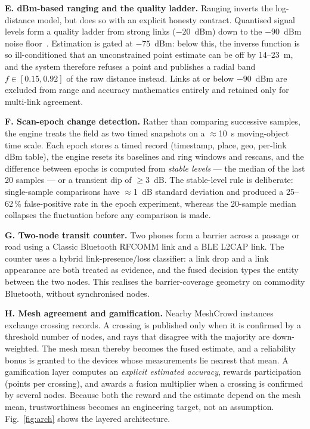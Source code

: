 \documentclass[journal,10pt]{IEEEtran}
\begin{document}
\textbf{E. dBm-based ranging and the quality ladder.} Ranging inverts the
log-distance model, but does so with an explicit honesty contract. Quantised
signal levels form a quality ladder from strong links ($-20$~dBm) down to the
$-90$~dBm noise floor~\cite{ramirez2021,milano2024,bai2020}. Estimation is gated
at $-75$~dBm: below this, the inverse function is so ill-conditioned that an
unconstrained point estimate can be off by 14--23~m, and the system therefore
refuses a point and publishes a radial band $f \in [0.15, 0.92]$ of the raw
distance instead. Links at or below $-90$~dBm are excluded from range and
accuracy mathematics entirely and retained only for multi-link agreement.

\textbf{F. Scan-epoch change detection.} Rather than comparing successive
samples, the engine treats the field as two timed snapshots on a $\approx$10~s
moving-object time scale. Each epoch stores a timed record (timestamp, place,
geo, per-link dBm table), the engine resets its baselines and ring windows and
rescans, and the difference between epochs is computed from \emph{stable levels}
--- the median of the last 20 samples --- or a transient dip of $\geq 3$~dB. The
stable-level rule is deliberate: single-sample comparisons have $\approx$1~dB
standard deviation and produced a 25--62\,\% false-positive rate in the epoch
experiment, whereas the 20-sample median collapses the fluctuation before any
comparison is made.

\textbf{G. Two-node transit counter.} Two phones form a barrier across a
passage or road using a Classic Bluetooth RFCOMM link and a BLE L2CAP link. The
counter uses a hybrid link-presence/loss classifier: a link drop and a link
appearance are both treated as evidence, and the fused decision types the entity
between the two nodes. This realises the barrier-coverage geometry on commodity
Bluetooth, without synchronised nodes.

\textbf{H. Mesh agreement and gamification.} Nearby MeshCrowd instances
exchange crossing records. A crossing is published only when it is confirmed by
a threshold number of nodes, and rays that disagree with the majority are
down-weighted. The mesh mean thereby becomes the fused estimate, and a
reliability bonus is granted to the devices whose measurements lie nearest that
mean. A gamification layer computes an \emph{explicit estimated accuracy},
rewards participation (points per crossing), and awards a fusion multiplier when
a crossing is confirmed by several nodes. Because both the reward and the
estimate depend on the mesh mean, trustworthiness becomes an engineering
target, not an assumption. Fig.~\ref{fig:arch} shows the layered architecture.
\end{document}
